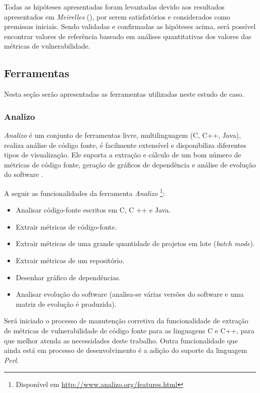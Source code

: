 Todas as hipóteses apresentadas foram levantadas devido aos resultados apresentados em
\emph{Meirelles} (\citeyear{meirelles2013}), por serem satisfatórios e
considerados como premissas iniciais. Sendo validadas e confirmadas as hipóteses
acima, será possível encontrar valores de referência baseado em análises
quantitativas dos valores das métricas de vulnerabilidade. 

\subsection{Ferramentas} \label{subsec:ferramentas}

Nesta seção serão apresentadas as ferramentas utilizadas neste estudo de caso.

\subsubsection{Analizo} \label{analizo}

\emph{Analizo} é um conjunto de ferramentas livre, multilinguagem (C, C++, Java), realiza análise de código fonte, é facilmente 
extensível e disponibiliza diferentes tipos de visualização. Ele suporta a extração e cálculo de um bom número de métricas de 
código fonte, geração de gráficos de dependência e análise de evolução do software \cite{analizo}.

A seguir as funcionalidades da ferramenta \emph{Analizo} \footnote{Disponível em
\url{http://www.analizo.org/features.html}}:

\begin{itemize}
  \item Analisar código-fonte escritos em C, C ++ e Java.
  \item Extrair métricas de código-fonte.
  \item Extrair métricas de uma grande quantidade de projetos em lote (\textit{batch mode}).
  \item Extrair métricas de um repositório.
  \item Desenhar gráfico de dependências.
  \item Analisar evolução do software (analisa-se várias versões do software e uma matriz de evolução é produzida).
\end{itemize}

Será iniciado o processo de manutenção corretiva da funcionalidade de extração de métricas de vulnerabilidade de código fonte 
para as linguagens C e C++, para que melhor atenda as necessidades deste trabalho. Outra funcionalidade que ainda está em 
processo de desenvolvimento é a adição do suporte da linguagem \textit{Perl}.

